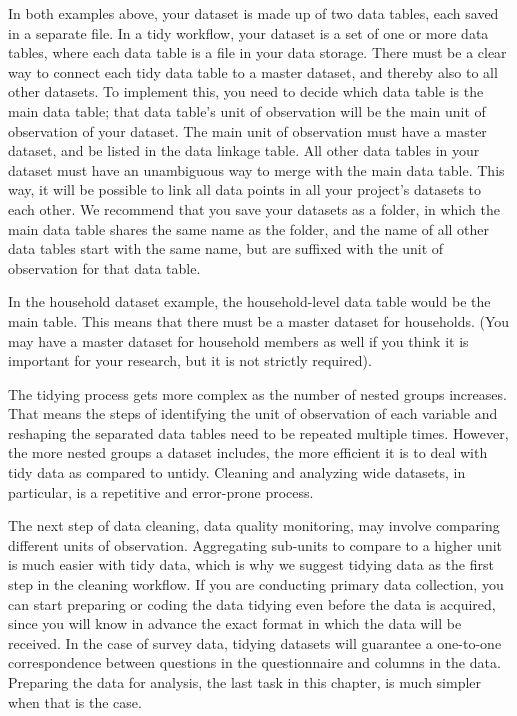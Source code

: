 In both examples above, your dataset is made up of two data tables,
each saved in a separate file.
In a tidy workflow, your dataset is a set of one or more data tables,
where each data table is a file in your data storage.
There must be a clear way to connect each
tidy data table to a master dataset,
and thereby also to all other datasets.
To implement this, you need to decide which data table is the main data table;
that data table's unit of observation will be
the main unit of observation of your dataset.
The main unit of observation must have a master dataset,
and be listed in the data linkage table.
All other data tables in your dataset must have
an unambiguous way to merge with the main data table.
This way, it will be possible to link
all data points in all your project's datasets to each other.
We recommend that you save your datasets as a folder,
in which the main data table shares the same name as the folder,
and the name of all other data tables start with the same name,
but are suffixed with the unit of observation for that data table.

In the household dataset example, 
the household-level data table would be the main table.
This means that there must be a master dataset for households.
(You may have a master dataset for household members as well
if you think it is important for your research,
but it is not strictly required).

The tidying process gets more complex as the number of nested groups increases.
That means the steps of identifying the unit of observation of each variable
and reshaping the separated data tables need to be repeated multiple times.
However, the more nested groups a dataset includes,
the more efficient it is to deal with tidy data as compared to untidy.
Cleaning and analyzing wide datasets, in particular,
is a repetitive and error-prone process.

The next step of data cleaning, data quality monitoring,
may involve comparing different units of observation.
Aggregating sub-units to compare to a higher unit is much easier with tidy data,
which is why we suggest tidying data as the first step in the cleaning workflow.
If you are conducting primary data collection,
you can start preparing or coding the data tidying even before the data is acquired,
since you will know in advance the exact format in which the data will be received.
In the case of survey data,
tidying datasets will guarantee a one-to-one correspondence
between questions in the questionnaire and columns in the data.
Preparing the data for analysis, the last task in this chapter,
is much simpler when that is the case.

